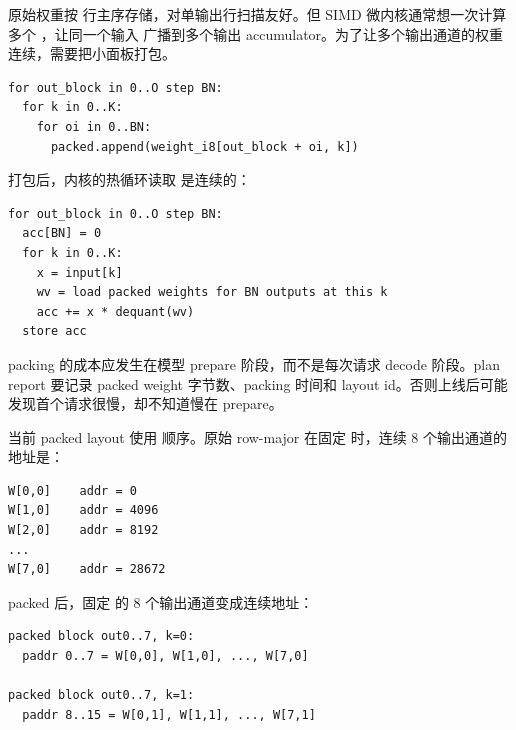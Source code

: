 原始权重按 \code{[out,k]} 行主序存储，对单输出行扫描友好。但 SIMD 微内核通常想一次计算多个 ，让同一个输入  广播到多个输出 accumulator。为了让多个输出通道的权重连续，需要把小面板打包。

\begin{lstlisting}[numbers=none,caption={packed int8 panel 示意}]
for out_block in 0..O step BN:
  for k in 0..K:
    for oi in 0..BN:
      packed.append(weight_i8[out_block + oi, k])
\end{lstlisting}

打包后，内核的热循环读取  是连续的：

\begin{lstlisting}[numbers=none,caption={packed GEMV 热循环}]
for out_block in 0..O step BN:
  acc[BN] = 0
  for k in 0..K:
    x = input[k]
    wv = load packed weights for BN outputs at this k
    acc += x * dequant(wv)
  store acc
\end{lstlisting}

packing 的成本应发生在模型 prepare 阶段，而不是每次请求 decode 阶段。plan report 要记录 packed weight 字节数、packing 时间和 layout id。否则上线后可能发现首个请求很慢，却不知道慢在 prepare。

当前 packed layout 使用  顺序。原始 row-major 在固定  时，连续 8 个输出通道的地址是：

\begin{lstlisting}[numbers=none,caption={原始 row-major 多输出地址}]
W[0,0]    addr = 0
W[1,0]    addr = 4096
W[2,0]    addr = 8192
...
W[7,0]    addr = 28672
\end{lstlisting}

packed 后，固定  的 8 个输出通道变成连续地址：

\begin{lstlisting}[numbers=none,caption={packed panel 多输出地址}]
packed block out0..7, k=0:
  paddr 0..7 = W[0,0], W[1,0], ..., W[7,0]

packed block out0..7, k=1:
  paddr 8..15 = W[0,1], W[1,1], ..., W[7,1]
\end{lstlisting}

